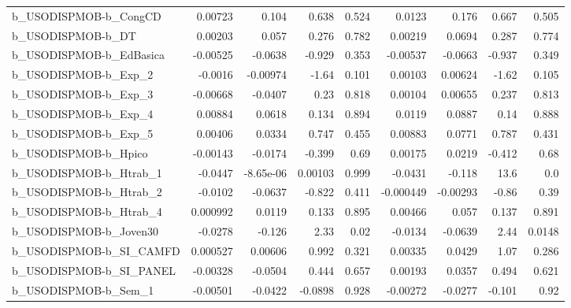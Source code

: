 \begin{tabular}{lrrrrrrrr}
b\_USODISPMOB-b\_CongCD      &     0.00723 &        0.104 &    0.638 &    0.524 &     0.0123 &       0.176 &        0.667 &         0.505 \\
b\_USODISPMOB-b\_DT          &     0.00203 &        0.057 &    0.276 &    0.782 &    0.00219 &      0.0694 &        0.287 &         0.774 \\
b\_USODISPMOB-b\_EdBasica    &    -0.00525 &      -0.0638 &   -0.929 &    0.353 &   -0.00537 &     -0.0663 &       -0.937 &         0.349 \\
b\_USODISPMOB-b\_Exp\_2       &     -0.0016 &     -0.00974 &    -1.64 &    0.101 &    0.00103 &     0.00624 &        -1.62 &         0.105 \\
b\_USODISPMOB-b\_Exp\_3       &    -0.00668 &      -0.0407 &     0.23 &    0.818 &    0.00104 &     0.00655 &        0.237 &         0.813 \\
b\_USODISPMOB-b\_Exp\_4       &     0.00884 &       0.0618 &    0.134 &    0.894 &     0.0119 &      0.0887 &         0.14 &         0.888 \\
b\_USODISPMOB-b\_Exp\_5       &     0.00406 &       0.0334 &    0.747 &    0.455 &    0.00883 &      0.0771 &        0.787 &         0.431 \\
b\_USODISPMOB-b\_Hpico       &    -0.00143 &      -0.0174 &   -0.399 &     0.69 &    0.00175 &      0.0219 &       -0.412 &          0.68 \\
b\_USODISPMOB-b\_Htrab\_1     &     -0.0447 &    -8.65e-06 &  0.00103 &    0.999 &    -0.0431 &      -0.118 &         13.6 &           0.0 \\
b\_USODISPMOB-b\_Htrab\_2     &     -0.0102 &      -0.0637 &   -0.822 &    0.411 &  -0.000449 &    -0.00293 &        -0.86 &          0.39 \\
b\_USODISPMOB-b\_Htrab\_4     &    0.000992 &       0.0119 &    0.133 &    0.895 &    0.00466 &       0.057 &        0.137 &         0.891 \\
b\_USODISPMOB-b\_Joven30     &     -0.0278 &       -0.126 &     2.33 &     0.02 &    -0.0134 &     -0.0639 &         2.44 &        0.0148 \\
b\_USODISPMOB-b\_SI\_CAMFD    &    0.000527 &      0.00606 &    0.992 &    0.321 &    0.00335 &      0.0429 &         1.07 &         0.286 \\
b\_USODISPMOB-b\_SI\_PANEL    &    -0.00328 &      -0.0504 &    0.444 &    0.657 &    0.00193 &      0.0357 &        0.494 &         0.621 \\
b\_USODISPMOB-b\_Sem\_1       &    -0.00501 &      -0.0422 &  -0.0898 &    0.928 &   -0.00272 &     -0.0277 &       -0.101 &          0.92 \\

\end{tabular}
